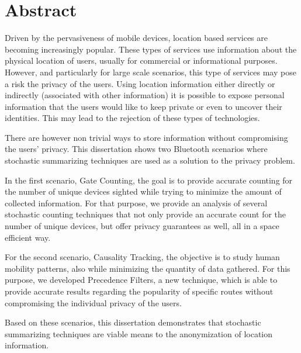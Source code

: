 \chapter*{Abstract}

Driven by the pervasiveness of mobile devices, location based services
are becoming increasingly popular. These types of services use
information about the physical location of users, usually for
commercial or informational purposes.  However, and particularly for
large scale scenarios, this type of services may pose a risk the
privacy of the users. Using location information either
directly or indirectly (associated with other information) it is
possible to expose personal information that the users would like to
keep private or even to uncover their identities.  This may lead to
the rejection of these types of technologies.

There are however non trivial ways to store information without
compromising the users' privacy.  This dissertation shows two
Bluetooth scenarios where stochastic summarizing techniques are used
as a solution to the privacy problem.

In the first scenario, Gate Counting, the goal is to provide accurate
counting for the number of unique devices sighted while trying to
minimize the amount of collected information. For that purpose,
we provide an analysis of several stochastic counting techniques that
not only provide an accurate count for the number of unique devices,
but offer privacy guarantees as well, all in a space efficient way.

For the second scenario, Causality Tracking, the objective is to study
human mobility patterns, also while minimizing the quantity of data
gathered.  For this purpose, we developed Precedence Filters, a new
technique, which is able to provide accurate results regarding the
popularity of specific routes without compromising the individual
privacy of the users.

Based on these scenarios, this dissertation demonstrates that
stochastic summarizing techniques are viable means to the
anonymization of location information.

